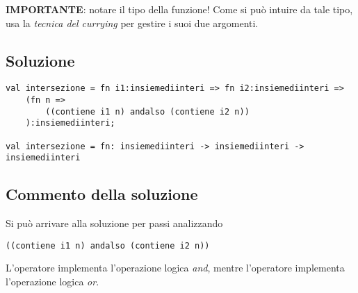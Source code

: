\textbf{IMPORTANTE}: notare il tipo della funzione! Come si può intuire da tale tipo, usa la \emph{tecnica del currying} per gestire i suoi due argomenti.

\subsection{Soluzione}

\begin{lstlisting}[style = SML, caption = {Definizione della funzione \sml{intersezione}}]
val intersezione = fn i1:insiemediinteri => fn i2:insiemediinteri =>
	(fn n =>
		((contiene i1 n) andalso (contiene i2 n))
	):insiemediinteri;

val intersezione = fn: insiemediinteri -> insiemediinteri -> insiemediinteri
\end{lstlisting}

\subsection{Commento della soluzione}

Si può arrivare alla soluzione per passi analizzando

\begin{lstlisting}[style = SML]
((contiene i1 n) andalso (contiene i2 n))
\end{lstlisting}

L'operatore  implementa l'operazione logica \emph{and}, mentre l'operatore  implementa l'operazione logica \emph{or}.
